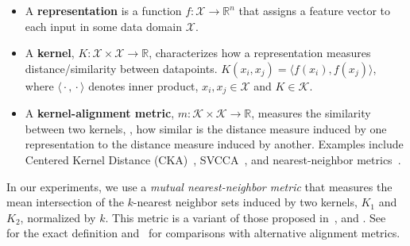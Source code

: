 \documentclass{article}
\newcommand{\tz}[1]{{\color{magenta}TZ: #1}}
\newcommand{\fixme}[1]{{\bf\color{red}FIXME: #1}}
\theoremstyle{plain}
\theoremstyle{definition}
\theoremstyle{remark}
\begin{document}
\begin{itemize}[topsep=-1.5pt,itemsep=-1.5pt,leftmargin=10pt]
    \item A \textbf{representation} is a function $f\colon \mathcal{X} \rightarrow \mathbb{R}^n$ that assigns a feature vector to each input in some data domain $\mathcal{X}$. %
    \item A \textbf{kernel}, $K\colon \mathcal{X} \times \mathcal{X} \rightarrow \mathbb{R}$, characterizes how a representation measures distance/similarity between datapoints. $K(x_i,x_j) = \langle f(x_i), f(x_j) \rangle$, where $\langle {{}\cdot{}},{{}\cdot{}}\rangle$ denotes inner product, $x_i, x_j \in \mathcal{X}$ and $K \in \mathcal{K}$.
    \item A \textbf{kernel-alignment metric}, $m\colon \mathcal{K} \times \mathcal{K} \rightarrow \mathbb{R}$, measures the similarity between two kernels, \ie, how similar is the distance measure induced by one representation to the distance measure induced by another. Examples include Centered Kernel Distance (CKA)~\cite{kornblith2019similarity}, SVCCA~\cite{raghu2017svcca}, and nearest-neighbor metrics~\cite{klabunde2023similarity}.
\end{itemize}

In our experiments, we use a \emph{mutual nearest-neighbor metric} that measures the mean intersection of the $k$-nearest neighbor sets induced by two kernels, $K_1$ and $K_2$, normalized by $k$.
This metric is a variant of those proposed in~\citet{park2024quantifying}, \citet{klabunde2023similarity} and \citet{oron2017best}.
See~ for the exact definition and~ for comparisons with alternative alignment metrics.
\end{document}
